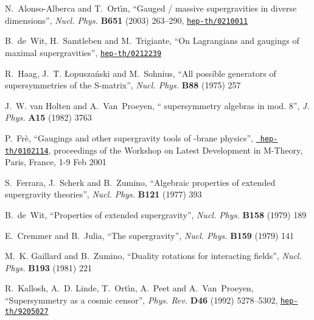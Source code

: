 \documentclass[a4paper,11pt,twoside]{article}
\providecommand{\SO}{\mathop{\rm SO}}
\begin{document}
\begin{thebibliography}{10}
{\sc N.~Alonso-Alberca and T.~Ort{\'\i}n}, ``Gauged / massive supergravities
in
  diverse dimensions'',  {\sl Nucl. Phys.} {\bf B651} (2003) 263--290,
\href{http://www.arXiv.org/abs/hep-th/0210011}{{\tt hep-th/0210011}}

{\sc B.~de~Wit, H.~Samtleben  and M.~Trigiante}, ``On Lagrangians and
gaugings
  of maximal supergravities'',
\href{http://www.arXiv.org/abs/hep-th/0212239}{{\tt hep-th/0212239}}

{\sc R.~Haag, J.~T. {\L}opusza\'nski  and M.~Sohnius}, ``All possible
  generators of supersymmetries of the S-matrix'',  {\sl Nucl. Phys.} {\bf B88}
  (1975)
257

{\sc J.~W. van Holten and A.~Van~Proeyen}, ``\coordHE{} supersymmetry
algebras in
  \coordHE{} mod. 8'',  {\sl J. Phys.} {\bf A15} (1982)
3763

{\sc P.~Fr{\`e}}, ``Gaugings and other supergravity tools of \coordHE{}-brane
  physics'',  \href{http://www.arXiv.org/abs/hep-th/0102114}{{\tt
  hep-th/0102114}},
proceedings of the Workshop on Latest Development in M-Theory, Paris,
France,
  1-9 Feb 2001

{\sc S.~Ferrara, J.~Scherk  and B.~Zumino}, ``Algebraic properties of
extended
  supergravity theories'',  {\sl Nucl. Phys.} {\bf B121} (1977)
393

{\sc B.~de~Wit}, ``Properties of \myHighlight{$\SO(8)$}\coordHE{} extended supergravity'',  {\sl
Nucl.
  Phys.} {\bf B158} (1979)
189

{\sc E.~Cremmer and B.~Julia}, ``The \myHighlight{$\SO(8)$}\coordHE{} supergravity'',  {\sl Nucl.
  Phys.} {\bf B159} (1979)
141

{\sc M.~K. Gaillard and B.~Zumino}, ``Duality rotations for interacting
  fields'',  {\sl Nucl. Phys.} {\bf B193} (1981)
221

{\sc R.~Kallosh, A.~D. Linde, T.~Ort{\'\i}n, A.~Peet  and A.~Van~Proeyen},
  ``Supersymmetry as a cosmic censor'',  {\sl Phys. Rev.} {\bf D46} (1992)
  5278--5302,
\href{http://arXiv.org/abs/hep-th/9205027}{{\tt hep-th/9205027}}


\end{thebibliography}
\end{document}
